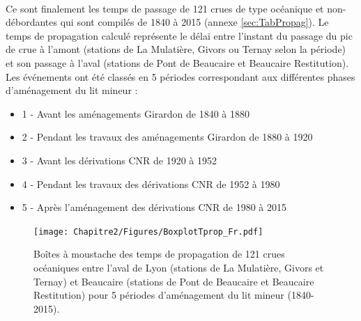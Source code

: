 	\paragraph{} Ce sont finalement les temps de passage de 121 crues de type océanique et non-débordantes qui sont compilés de 1840 à 2015 (annexe \ref{sec:TabPropag}). Le temps de propagation calculé représente le délai entre l'instant du passage du pic de crue à l'amont (stations de La Mulatière, Givors ou Ternay selon la période) et son passage à l'aval (stations de Pont de Beaucaire et Beaucaire Restitution). Les événements ont été classés en 5 périodes correspondant aux différentes phases d'aménagement du lit mineur : 
	\begin{itemize}
		\item 1 - Avant les aménagements Girardon de 1840 à 1880
		\item 2 - Pendant les travaux des aménagements Girardon de 1880 à 1920
		\item 3 - Avant les dérivations CNR de 1920 à 1952
		\item 4 - Pendant les travaux des dérivations CNR de 1952 à 1980
		\item 5 - Après l'aménagement des dérivations CNR de 1980 à 2015
	\end{itemize}

	\begin{figure}[h!]
		\centering
			\texttt{[image: Chapitre2/Figures/BoxplotTprop\_Fr.pdf]}
	        \caption{Boîtes à moustache des temps de propagation de 121 crues océaniques entre l'aval de Lyon (stations de La Mulatière, Givors et Ternay) et Beaucaire (stations de Pont de Beaucaire et Beaucaire Restitution) pour 5 périodes d'aménagement du lit mineur (1840-2015).}
			\label{fig:BoxplotPropag}
		\end{figure}	

